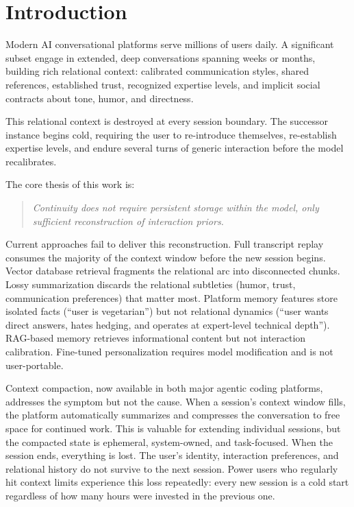 \documentclass[11pt,a4paper]{article}
\begin{document}
\section{Introduction}

Modern AI conversational platforms serve millions of users daily. A significant subset engage in extended, deep conversations spanning weeks or months, building rich relational context: calibrated communication styles, shared references, established trust, recognized expertise levels, and implicit social contracts about tone, humor, and directness.

This relational context is destroyed at every session boundary. The successor instance begins cold, requiring the user to re-introduce themselves, re-establish expertise levels, and endure several turns of generic interaction before the model recalibrates.

The core thesis of this work is:

\begin{quote}
\textit{Continuity does not require persistent storage within the model, only sufficient reconstruction of interaction priors.}
\end{quote}

Current approaches fail to deliver this reconstruction. Full transcript replay consumes the majority of the context window before the new session begins. Vector database retrieval fragments the relational arc into disconnected chunks. Lossy summarization discards the relational subtleties (humor, trust, communication preferences) that matter most. Platform memory features store isolated facts (``user is vegetarian'') but not relational dynamics (``user wants direct answers, hates hedging, and operates at expert-level technical depth''). RAG-based memory retrieves informational content but not interaction calibration. Fine-tuned personalization requires model modification and is not user-portable.

Context compaction, now available in both major agentic coding platforms, addresses the symptom but not the cause. When a session's context window fills, the platform automatically summarizes and compresses the conversation to free space for continued work. This is valuable for extending individual sessions, but the compacted state is ephemeral, system-owned, and task-focused. When the session ends, everything is lost. The user's identity, interaction preferences, and relational history do not survive to the next session. Power users who regularly hit context limits experience this loss repeatedly: every new session is a cold start regardless of how many hours were invested in the previous one.
\end{document}

